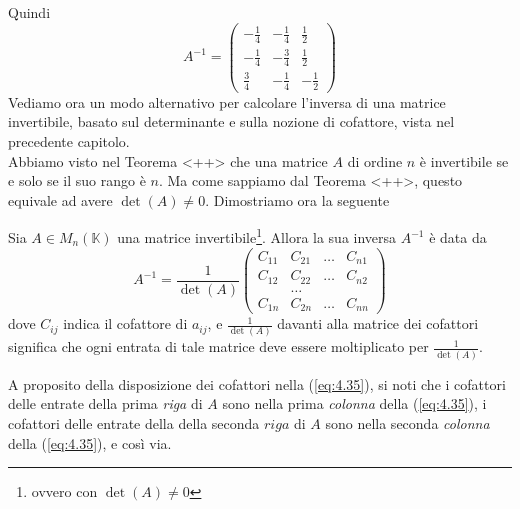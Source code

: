 Quindi
\begin{equation*}
  A^{-1}=
  \begin{pmatrix}
    -\frac{1}{4}&-\frac{1}{4}&\frac{1}{2}\\
    -\frac{1}{4}&-\frac{3}{4}&\frac{1}{2}\\
    \frac{3}{4}&-\frac{1}{4}&-\frac{1}{2}
  \end{pmatrix}
\end{equation*}
Vediamo ora un modo alternativo per calcolare l'inversa di una matrice invertibile, basato sul determinante e
sulla nozione di cofattore, vista nel precedente capitolo.\\
Abbiamo visto nel Teorema <++> che una matrice $A$ di ordine $n$ è invertibile se e solo se il suo rango è $n$.
Ma come sappiamo dal Teorema <++>, questo equivale ad avere $\det(A)\neq 0$. Dimostriamo ora la seguente
\begin{proposizione}
  Sia $A\in M_n(\mathds{K})$ una matrice invertibile\footnote{ovvero con $\det(A)\neq 0$}. Allora la sua inversa
  $A^{-1}$ è data da
  \begin{equation}
    \label{eq:4.35}
    A^{-1}=\frac{1}{\det (A)}
    \begin{pmatrix}
      C_{11} &C_{21}&\dots & C_{n1}\\
      C_{12} &C_{22}&\dots & C_{n2}\\
      & \dots\\
      C_{1n} & C_{2n} &\dots & C_{nn}
    \end{pmatrix}
  \end{equation}
  dove $C_{ij}$ indica il cofattore di $a_{ij}$, e $\frac{1}{\det(A)}$ davanti alla matrice dei cofattori
  significa che ogni entrata di tale matrice deve essere moltiplicato per $\frac{1}{\det (A)}$.
\end{proposizione}
\begin{osservazione}
  \label{oss:10}
  A proposito della disposizione dei cofattori nella (\ref{eq:4.35}), si noti che i cofattori delle entrate della
  prima \textit{riga} di $A$ sono nella prima \textit{colonna} della (\ref{eq:4.35}), i cofattori delle entrate
  della della seconda $riga$ di $A$ sono nella seconda \textit{colonna} della (\ref{eq:4.35}), e così via.
\end{osservazione}
